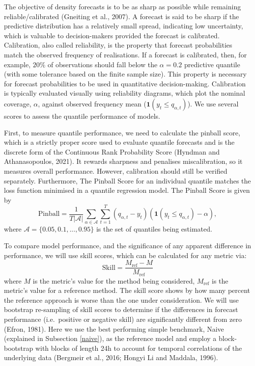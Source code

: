 \documentclass[]{elsarticle} %
\begin{document}
The objective of density forecasts is to be as sharp as possible while
remaining reliable/calibrated (Gneiting et al., 2007). A forecast
is said to be sharp if the predictive distribution has a relatively
small spread, indicating low uncertainty, which is valuable to
decision-makers provided the forecast is calibrated. Calibration, also
called reliability, is the property that forecast probabilities match
the observed frequency of realisations. If a forecast is calibrated,
then, for example, \(20\%\) of observations should fall below the
\(\alpha=0.2\) predictive quantile (with some tolerance based on the
finite sample size). This property is necessary for forecast
probabilities to be used in quantitative decision-making. Calibration is
typically evaluated visually using reliability diagrams, which plot the
nominal coverage, \(\alpha\), against observed frequency mean
(\(\mathbf{1}(y_{t}\leq q_{\alpha,t})\)). We use several scores to assess
the quantile performance of models.

First, to measure quantile performance, we need to calculate the pinball
score, which is a strictly proper score used to evaluate quantile
forecasts and is the discrete form of the Continuous Rank Probability
Score (Hyndman and Athanasopoulos, 2021). It rewards sharpness and penalises
miscalibration, so it measures overall performance. However, calibration
should still be verified separately. Furthermore, The Pinball Score for
an individual quantile matches the loss function minimised in a quantile
regression model. The Pinball Score is given by \begin{equation}
    \text{Pinball} = 
    \frac{1}{T|\mathcal{A}|} \sum_{\alpha \in \mathcal{A}} \sum_{t=1}^T
 \left(q_{\alpha,t} - y_{t} \right)
 \left(\mathbf{1}(y_{t}\leq q_{\alpha,t})-\alpha \right) ,
 \label{eq:pinball}
\end{equation} where \(\mathcal{A} = \{0.05,0.1,...,0.95\}\) is the set of
quantiles being estimated.

To compare model performance, and the significance of any apparent
difference in performance, we will use skill scores, which can be
calculated for any metric via: \begin{equation}
  \mathrm{Skill} = \frac{M_\mathrm{ref} - M}{M_\mathrm{ref}} \label{eq:skillscore}
\end{equation} where \(M\) is the metric's value for the method being
considered, \(M_\mathrm{ref}\) is the metric's value for a reference
method. The skill score shows by how many percent the reference
approach is worse than the one under consideration. We will use
bootstrap re-sampling of skill scores to determine if the differences in
forecast performance (i.e.~positive or negative skill) are significantly
different from zero (Efron, 1981). Here we use the best
performing simple benchmark, Naive (explained in Subsection
\ref{naive}), as the reference model and employ a block-bootstrap
with blocks of length 24h to account for temporal correlations of the
underlying data (Bergmeir et al., 2016; Hongyi Li and Maddala, 1996).
\end{document}
